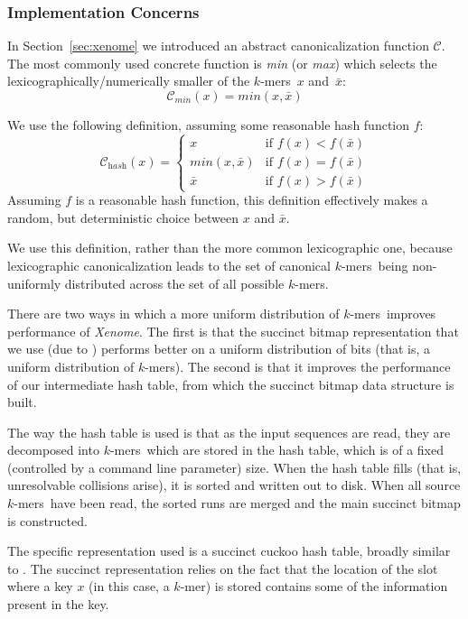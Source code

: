 \documentclass{bioinfo}
\newcommand{\Xenome}{\textit{Xenome}{}}
\newcommand{\kmer}{$k$-mer{}}
\newcommand{\kmers}{$k$-mers{}}
\begin{document}
\subsubsection{Implementation Concerns}

In Section~\ref{sec:xenome} we introduced an abstract canonicalization function
$\mathcal{C}$. The most commonly used concrete function is \textit{min}
(or \textit{max}) which selects the lexicographically/numerically smaller
of the \kmers~$x$ and~$\bar{x}$:
$$
    \mathcal{C}_{\textit{min}}(x) = \textit{min}(x, \bar{x})
$$

We use the following definition, assuming some reasonable hash function $f$:
$$
\mathcal{C}_{\textit{hash}}(x) =
\left\{
    \begin{array}{ll}
        x       & \mbox{if } \textit{f}(x) < \textit{f}(\bar{x}) \\
        \textit{min}(x,\bar{x}) & \mbox{if } \textit{f}(x) = \textit{f}(\bar{x}) \\
        \bar{x} & \mbox{if } \textit{f}(x) > \textit{f}(\bar{x})
    \end{array}
\right.
$$
Assuming $f$ is a reasonable hash function,
this definition effectively makes a random, but deterministic choice
between $x$ and $\bar{x}$.

We use this definition, rather than the more common lexicographic one,
because lexicographic canonicalization leads to the set of canonical
\kmers\ being non-uniformly distributed across the set of all possible
\kmers.

There are two ways in which a more uniform distribution of \kmers\ 
improves performance of \Xenome.
The first is that the succinct bitmap representation that we use
(due to \cite{OkSa06}) performs better on a uniform distribution of bits
(that is, a uniform distribution of \kmers).
The second is that it improves the performance of our intermediate
hash table, from which the succinct bitmap data structure is built.

The way the hash table is used is that as the input sequences
are read, they are decomposed into \kmers\ which are stored in the hash
table, which is of a fixed (controlled by a command line parameter) size.
When the hash table fills (that is, unresolvable collisions arise), it
is sorted and written out to disk. When all source \kmers\ have been
read, the sorted runs are merged and the main succinct bitmap is constructed.

The specific representation used is a succinct cuckoo hash table,
broadly similar to \cite{ArbitmanBackyardCuckoo}.
The succinct representation relies on the fact that the location of
the slot where a key $x$ (in this case, a \kmer) is stored
contains some of the information present in the key.
\end{document}
